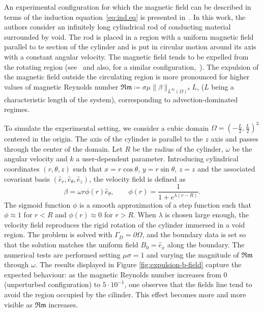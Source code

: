 \documentclass[11pt,a4paper]{article}
\newcounter{corr}
\theoremstyle{plain}
\theoremstyle{remark}
\theoremstyle{definition}
\newcommand{\norm}[2]{\|#2\|_{#1}}
\newcommand{\Rm}{\mathfrak{Rm}}
\begin{document}
An experimental configuration for which the magnetic field can be described in terms of the induction equation~\eqref{eq:ind.eq} is presented in~\cite{Perry.Jones:78}. In this work, the authors consider an infinitely long cylindrical rod of conducting material surrounded by void.
The rod is placed in a region with a uniform magnetic field parallel to te section of the cylinder and is put in circular motion around its axis with a constant angular velocity.
The magnetic field tends to be expelled from the rotating region (see~\cite[Figure 2]{Perry.Jones:78} and also, for a similar configuration,~\cite[Figure II.7]{Moreau:13}).
The expulsion of the magnetic field outside the circulating region is more pronounced for higher values of magnetic Reynolds number $\Rm \coloneqq \sigma\mu \norm{L^\infty(\Omega)^d}{\beta} L$, ($L$ being a characteristic length of the system), corresponding to advection-dominated regimes.

To simulate the experimental setting, we consider a cubic domain $\Omega=\left(-\frac{L}{2},\frac{L}{2}\right)^3$ centered in the origin.
The axis of the cylinder is parallel to the $z$ axis and passes through the center of the domain.
Let $R$ be the radius of the cylinder, $\omega$ be the angular velocity and $k$ a user-dependent parameter.
Introducing cylindrical coordinates $(r,\theta,z)$ such that $x=r \cos \theta$, $y=r\sin\theta$, $z=z$ and the associated covariant basis $(\hat{e}_r, \hat{e}_\theta, \hat{e}_z)$, the velocity field is defined as
\[
\beta = \omega r \phi(r) \hat{e}_\theta, \qquad \phi(r) = \frac{1}{1+ e^{\lambda(r-R)}}.
\]
The sigmoid function $\phi$ is a smooth approximation of a step function such that $\phi \approx 1$ for $r<R$ and $\phi(r)\approx 0$ for $r>R$.
When $\lambda$ is chosen large enough, the velocity field reproduces the rigid rotation of the cylinder immersed in a void region.
The problem is solved with $\Gamma_D=\partial\Omega$, and the boundary data is set so that the solution matches the uniform field $B_0 = \hat{e}_x$ along the boundary. The numerical tests are performed setting $\mu\sigma=1$ and varying the magnitude of $\Rm$ through $\omega$.
The results displayed in Figure \ref{fig:expulsion-b-field} capture the expected behaviour: as the magnetic Reynolds number increases from $0$ (unperturbed configuration) to $5 \cdot 10^{-1}$, one observes that the fields line tend to avoid the region occupied by the cilinder.
This effect becomes more and more visible as $\Rm$ increases.
\end{document}
